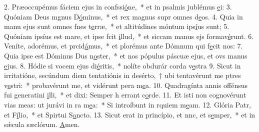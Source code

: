 2. Præoccupémus fáciem ejus in confssi\uline{ó}ne,~* et in psalmis jublémus \uline{e}i:
3. Quóniam Deus mgnus D\uline{ó}minus,~* et rex magnus supr omnes d\uline{e}os.
4. Quia in manu ejus sunt omnes fnes t\uline{e}rræ,~* et altitúdines móntum ips\uline{í}us sunt;
5. Quóniam ipsíus est mare, et ipse fcit \uline{i}llud,~* et siccam manus ejs formav\uline{é}runt.
6. Veníte, adorémus, et prcid\uline{á}mus,~* et plorémus ante Dómnum qui f\uline{e}cit nos:
7. Quia ipse est Dóminus Dus n\uline{o}ster,~* et nos pópulus páscuæ ejus, et ovs manus \uline{e}jus.
8. Hódie si vocem ejus di\uline{é}ritis,~* nolíte obdurár corda v\uline{e}stra
9. Sicut in irritatióne, secúndum diem tentatiónis in desérto,~† ubi tentavérunt me ptres v\uline{e}stri:~* probavérunt me, et vidérunt pera m\uline{e}a.
10. Quadragínta annis offénsus fui generatini \uline{i}lli,~* et dixi: Semper h errant c\uline{o}rde.
11. Et isti non cognovérunt vias meas: ut jurávi in ra m\uline{e}a:~* Si introíbunt in rquiem m\uline{e}am.
12. Glória Patr, et F\uline{í}lio,~* et Spirtui S\uline{a}ncto.
13. Sicut erat in princípio, et nnc, et s\uline{e}mper,~* et in sǽcula sæclórum. \uline{A}men.
